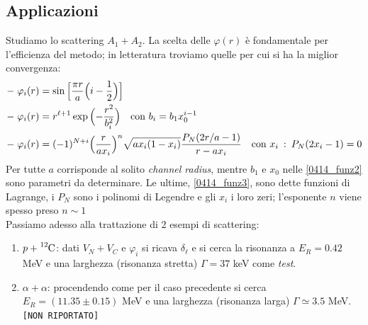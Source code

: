 \subsection{Applicazioni}
Studiamo lo scattering $A_1+A_2$. La scelta delle $\varphi (r)$ è fondamentale per l'efficienza del metodo; in letteratura troviamo quelle per cui si ha la miglior convergenza:
\begin{align}
	-\;&\varphi_i (r) = \sin{\pp{[}{\frac{\pi r}{a}\ppc{i-\frac{1}{2}}}{]}}%
	\label{0414_funz1} \\
	-\;&\varphi_i (r) = r^{\ell+1} \exp{\ppc{-\frac{r^2}{b^2_i}}}\quad \text{con } b_i = b_1 x_0^{i-1}%
	\label{0414_funz2} \\
	-\;&\varphi_i (r) = (-1)^{N+i} \ppc{\frac{r}{ax_i}}^n \sqrt{a x_i (1-x_i)} \frac{P_N(2r/a - 1)}{r-ax_i} \quad \text{con } x_i \: : \: P_N(2x_i - 1) = 0 %
	\label{0414_funz3}
\end{align}
Per tutte $a$ corrisponde al solito \textit{channel radius}, mentre $b_1$ e $x_0$ nelle \eqref{0414_funz2} sono parametri da determinare.
Le ultime, \eqref{0414_funz3}, sono dette funzioni di Lagrange, i $P_N$ sono i polinomi di Legendre e gli $x_i$ i loro zeri; l'esponente $n$ viene spesso preso $n\sim 1$\\
Passiamo adesso alla trattazione di 2 esempi di scattering:
\begin{enumerate}
	\item $p+\ce{^{12}C}$: dati $V_N+V_C$ e $\varphi_i$ si ricava $\delta_\ell$ e si cerca la risonanza a $E_R = 0.42$ MeV e una larghezza (risonanza stretta) $\Gamma=37$ keV come \textit{test}.
	\item $\alpha + \alpha$: procendendo come per il caso precedente si cerca $E_R= (11.35 \pm 0.15)$ MeV e una larghezza (risonanza larga) $\Gamma\simeq 3.5$ MeV.\\
	\texttt{[NON RIPORTATO]}  
\end{enumerate}

